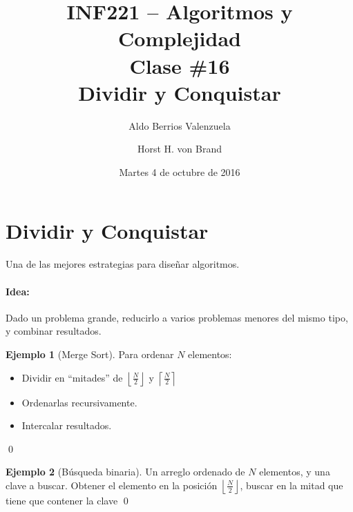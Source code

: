 \documentclass[english, spanish, fleqn, 10pt]{article}
\author{Aldo Berrios Valenzuela \and Horst H. von Brand}
\title{INF221 -- Algoritmos y Complejidad\\[.4\baselineskip]Clase \#16\\Dividir y Conquistar}
\date{Martes 4 de octubre de 2016}
\newcommand{\comillas}[1]{``#1''}
\numberwithin{equation}{section}
\theoremstyle{definition}
\newtheorem{beforeExample}{Ejemplo}[section]
\newenvironment{ejemplo}[1][]{\begin{beforeExample}[#1]\renewcommand{\qedsymbol}{$\blacksquare$}}{\qed\end{beforeExample}}
\begin{document}

\maketitle

\section{Dividir y Conquistar}
Una de las mejores estrategias para diseñar algoritmos.

\paragraph{Idea:} Dado un problema grande, reducirlo a varios problemas menores del mismo tipo, y combinar resultados.

\begin{ejemplo}[Merge Sort]
	Para ordenar $N$ elementos:
	\begin{itemize}
		\item Dividir en \comillas{mitades} de $\left\lfloor \frac{N}{2} \right\rfloor$ y $\left\lceil \frac{N}{2}\right\rceil$
		\item Ordenarlas recursivamente.
		\item Intercalar resultados.
	\end{itemize}
\end{ejemplo}

\begin{ejemplo}[Búsqueda binaria]
	Un arreglo ordenado de $N$ elementos, y una clave a buscar. Obtener el elemento en la posición $\left\lfloor \frac{N}{2} \right\rfloor$, buscar en la mitad que tiene que contener la clave
\end{ejemplo}
\end{document}
